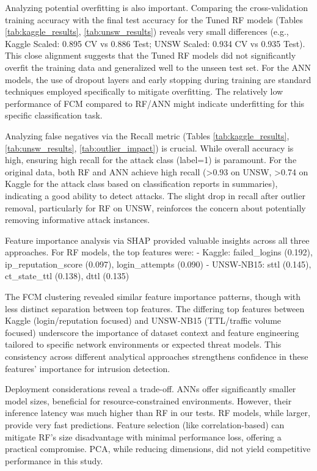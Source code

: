 \documentclass[sigconf,screen,final,nonacm]{acmart}
\begin{document}
Analyzing potential overfitting is also important. Comparing the cross-validation training accuracy with the final test accuracy for the Tuned RF models (Tables \ref{tab:kaggle_results}, \ref{tab:unsw_results}) reveals very small differences (e.g., Kaggle Scaled: 0.895 CV vs 0.886 Test; UNSW Scaled: 0.934 CV vs 0.935 Test). This close alignment suggests that the Tuned RF models did not significantly overfit the training data and generalized well to the unseen test set. For the ANN models, the use of dropout layers and early stopping during training are standard techniques employed specifically to mitigate overfitting. The relatively low performance of FCM compared to RF/ANN might indicate underfitting for this specific classification task.

Analyzing false negatives via the Recall metric (Tables \ref{tab:kaggle_results}, \ref{tab:unsw_results}, \ref{tab:outlier_impact}) is crucial. While overall accuracy is high, ensuring high recall for the attack class (label=1) is paramount. For the original data, both RF and ANN achieve high recall (>0.93 on UNSW, >0.74 on Kaggle for the attack class based on classification reports in summaries), indicating a good ability to detect attacks. The slight drop in recall after outlier removal, particularly for RF on UNSW, reinforces the concern about potentially removing informative attack instances.

Feature importance analysis via SHAP provided valuable insights across all three approaches. For RF models, the top features were:
- Kaggle: failed\_logins (0.192), ip\_reputation\_score (0.097), login\_attempts (0.090)
- UNSW-NB15: sttl (0.145), ct\_state\_ttl (0.138), dttl (0.135)

The FCM clustering revealed similar feature importance patterns, though with less distinct separation between top features. The differing top features between Kaggle (login/reputation focused) and UNSW-NB15 (TTL/traffic volume focused) underscore the importance of dataset context and feature engineering tailored to specific network environments or expected threat models. This consistency across different analytical approaches strengthens confidence in these features' importance for intrusion detection.

Deployment considerations reveal a trade-off. ANNs offer significantly smaller model sizes, beneficial for resource-constrained environments. However, their inference latency was much higher than RF in our tests. RF models, while larger, provide very fast predictions. Feature selection (like correlation-based) can mitigate RF's size disadvantage with minimal performance loss, offering a practical compromise. PCA, while reducing dimensions, did not yield competitive performance in this study.
\end{document}
